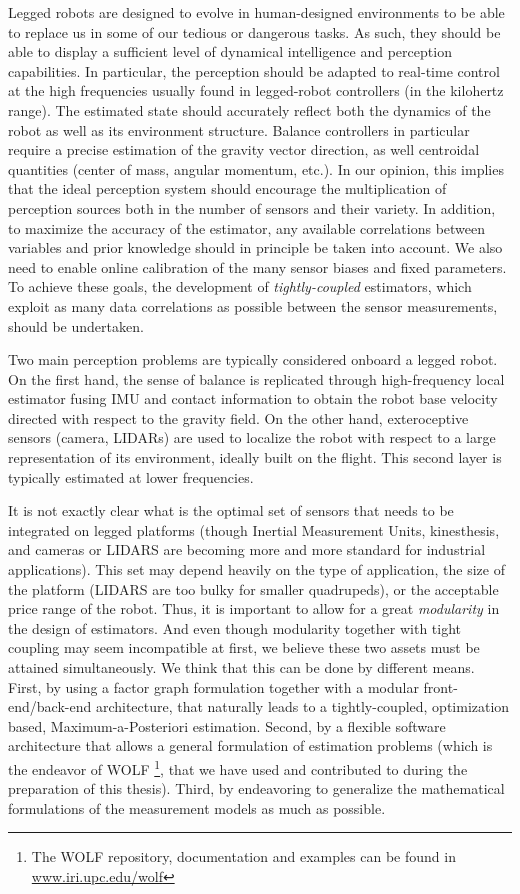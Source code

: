 Legged robots are designed to evolve in human-designed environments to be able to replace us in some of our tedious or dangerous tasks. As such, they should be able to
display a sufficient level of dynamical intelligence and perception capabilities. 
In particular, the perception should be adapted to real-time control at the high frequencies usually found in legged-robot controllers (in the kilohertz range).
The estimated state should accurately reflect both the dynamics of the robot as well as its environment structure. Balance controllers in particular require a precise 
estimation of the gravity vector direction, as well centroidal quantities (center of mass, angular momentum, etc.).
In our opinion, this implies that the ideal perception system should encourage the multiplication of perception sources both in the number of sensors and their variety.
In addition, to maximize the accuracy of the estimator, any available correlations between variables and prior knowledge should in principle be taken into account. 
We also need to enable online calibration of the many sensor biases and fixed parameters. To achieve these goals, the development of \textit{tightly-coupled} estimators, 
which exploit as many data correlations as possible between the sensor measurements, should be undertaken.

Two main perception problems are typically considered onboard a legged robot. On the first hand, the sense of balance is replicated through high-frequency
local estimator fusing IMU and contact information to obtain the robot base velocity directed with respect to the gravity field. On the other hand,
exteroceptive sensors (camera, LIDARs) are used to localize the robot with respect to a large representation of its environment, ideally built on the flight.
This second layer is typically estimated at lower frequencies.

It is not exactly clear what is the optimal set of sensors that needs to be integrated on legged platforms (though Inertial Measurement Units, kinesthesis, and 
cameras or LIDARS are becoming more and more standard for industrial applications). This set may depend heavily on the type of application,
the size of the platform (LIDARS are too bulky for smaller quadrupeds), or the acceptable price range of the robot. Thus, it is important to allow
for a great \textit{modularity} in the design of estimators.
And even though modularity together with tight coupling may seem incompatible at first, we believe these two assets must be attained simultaneously.
We think that this can be done by different means. 
First, by using a factor graph formulation together with a modular front-end/back-end architecture, that naturally leads to a tightly-coupled, optimization based, Maximum-a-Posteriori estimation.
Second, by a flexible software architecture
that allows a general formulation of estimation problems (which is the endeavor of WOLF \cite{sola2021wolf}\footnote{The WOLF repository, documentation and examples can be 
found in \url{www.iri.upc.edu/wolf}}, that we have used and contributed to during the preparation of this thesis). Third, by endeavoring to generalize the mathematical formulations of the measurement models  as much as possible. 
 




